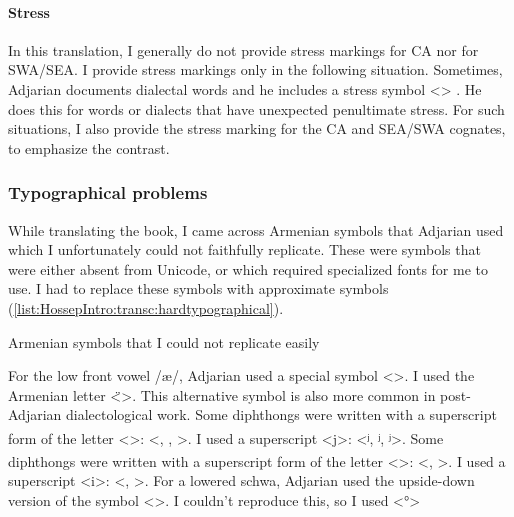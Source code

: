 \paragraph{Stress}
In this translation, I generally do not provide stress markings for CA nor for SWA/SEA. I provide stress markings only in the following situation. Sometimes, Adjarian documents dialectal words and he includes a stress symbol <> . He does this for words or dialects that have unexpected penultimate stress. For such situations, I also provide the stress marking for the CA and SEA/SWA cognates, to emphasize the contrast. 

\subsubsection{Typographical problems}\label{sec:HossepIntro:phonotransc:adj:typograph}

While translating the book, I came across Armenian symbols that Adjarian used which I unfortunately could not faithfully replicate. These were symbols that were either absent from Unicode, or which required specialized fonts for me to use. I had to replace these symbols with approximate symbols (\ref{list:HossepIntro:transc:hardtypographical}).

\begin{exe}
	\ex Armenian symbols that I could not replicate easily\label{list:HossepIntro:transc:hardtypographical}
	\begin{xlist}
\ex For the low front vowel /æ/, Adjarian used a special symbol 
<>. I used the  Armenian letter <̈>. This alternative symbol is also more common in post-Adjarian dialectological work. 
\ex Some diphthongs were written with a superscript form of the letter <>: <\textsuperscript{}, \textsuperscript{},   \textsuperscript{}>. I used a superscript <j>: 	<ʲ, ʲ, ʲ>. 
\ex Some diphthongs were written with a superscript form of the letter <>: <\textsuperscript{}, \textsuperscript{}>. I used a superscript <i>: 	<, >. 
\ex For a lowered schwa, Adjarian used the  upside-down version of the symbol <>. I couldn't reproduce this, so I used  <°> 
	\end{xlist}
\end{exe}



